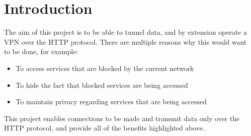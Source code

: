 \section{Introduction}
The aim of this project is to be able to tunnel data, and by extension operate a VPN over the HTTP protocol. There are multiple reasons why this would want to be done, for example:
\begin{itemize}
    \item To access services that are blocked by the current network
    \item To hide the fact that blocked services are being accessed
    \item To maintain privacy regarding services that are being accessed
\end{itemize}

This project enables connections to be made and transmit data only over the HTTP protocol, and provide all of the benefits highlighted above.
